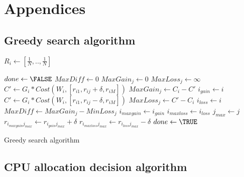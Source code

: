 \chapter{Appendices}

\section{Greedy search algorithm}

\label{sec:greedy}

\begin{algorithm}[H]
 \begin{algorithmic}
	\STATE $R_{i} \gets [\frac{1}{N},..,\frac{1}{N}]$
    \ENDFOR

   \STATE $done \gets \FALSE$
   \REPEAT
	\STATE $MaxDiff \gets 0$
	    \STATE $MaxGain_{j} \gets 0$
	    \STATE $MaxLoss_{j} \gets \infty$
		 \STATE $C' \gets G_{i} * Cost(W_{i},[r_{i1},  r_{ij} + \delta, r_{iM}])$ 
		     \STATE $MaxGain_{j} \gets C_{i} - C'$
		     \STATE $i_{gain} \gets i$
		 \ENDIF
		 \STATE $C' \gets G_{i} * Cost(W_{i},[r_{i1},  r_{ij} - \delta, r_{iM}])$ 
		     \STATE $MaxLoss_{j} \gets C' - C_{i}$
		     \STATE $i_{loss} \gets i$
		 \ENDIF
	    \ENDFOR
	    \STATE {}
		\STATE $MaxDiff \gets MaxGain_{j} - MinLoss_{j}$
		\STATE $i_{maxgain} \gets i_{gain}$
		\STATE $i_{maxloss} \gets i_{loss}$
		\STATE $j_{max} \gets j$
	    \ENDIF
	\ENDFOR
	    \STATE $r_{i_{maxgain}j_{max}} \gets r_{i_{gain}j_{max}} + \delta $
	    \STATE $r_{i_{maxloss}j_{max}} \gets r_{i_{loss}j_{max}} - \delta $
	\ELSE
	    \STATE $done \gets \TRUE$
	\ENDIF

 \end{algorithmic}
  \caption{Greedy search algorithm}
\end{algorithm}

\section{CPU allocation decision algorithm}
\label{sec:cpusearch}

